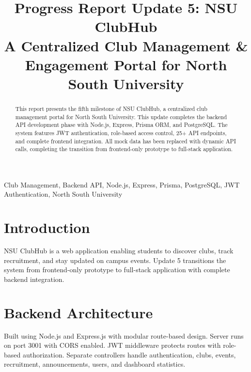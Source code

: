 \documentclass[conference]{IEEEtran}
\begin{document}
\title{Progress Report Update 5: NSU ClubHub\\
A Centralized Club Management \& Engagement Portal for North South University}

\author{
}

\maketitle

\begin{abstract}
This report presents the fifth milestone of NSU ClubHub, a centralized club management portal for North South University. This update completes the backend API development phase with Node.js, Express, Prisma ORM, and PostgreSQL. The system features JWT authentication, role-based access control, 25+ API endpoints, and complete frontend integration. All mock data has been replaced with dynamic API calls, completing the transition from frontend-only prototype to full-stack application.
\end{abstract}

\begin{IEEEkeywords}
Club Management, Backend API, Node.js, Express, Prisma, PostgreSQL, JWT Authentication, North South University
\end{IEEEkeywords}

\section{Introduction}
NSU ClubHub is a web application enabling students to discover clubs, track recruitment, and stay updated on campus events. Update 5 transitions the system from frontend-only prototype to full-stack application with complete backend integration.

\section{Backend Architecture}
Built using Node.js and Express.js with modular route-based design. Server runs on port 3001 with CORS enabled. JWT middleware protects routes with role-based authorization. Separate controllers handle authentication, clubs, events, recruitment, announcements, users, and dashboard statistics.
\end{document}
